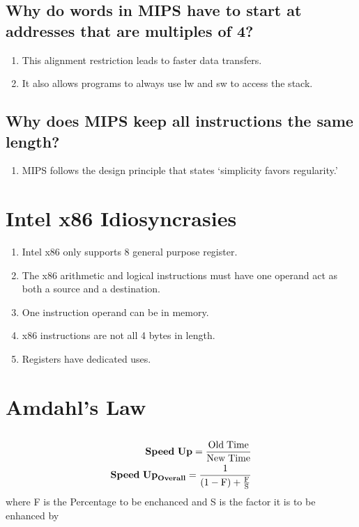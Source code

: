 \documentclass[12pt]{article}
\begin{document}
\subsection*{Why do words in MIPS have to start at addresses that are multiples of 4?}
\begin{enumerate}
	\item{This alignment restriction leads to faster data transfers.}
	\item{It also allows programs to always use lw and sw to access the stack.}
\end{enumerate}

\subsection*{Why does MIPS keep all instructions the same length?}
\begin{enumerate}
	\item{MIPS follows the design principle that states `simplicity favors regularity.'}
\end{enumerate}


\section{Intel x86 Idiosyncrasies}
\begin{enumerate}
	\item{Intel x86 only supports 8 general purpose register.}
	\item{The x86 arithmetic and logical instructions must have one operand act as both a source and a destination.}
	\item{One instruction operand can be in memory.}
	\item{x86 instructions are not all 4 bytes in length.}
	\item{Registers have dedicated uses.}
\end{enumerate}

\section{Amdahl's Law}
\subsection*{}
\begin{align*}
	\mathrm{\textbf{Speed\;Up}} = \frac{\mathrm{Old\;Time}}{\mathrm{New\;Time}}\\
	\mathrm{\textbf{Speed\;Up}}_{\mathrm{\textbf{Overall}}} = \frac{1}{(1-\mathrm{F})+\frac{\mathrm{F}}{\mathrm{S}}}\\
\end{align*}
where F is the Percentage to be enchanced and S is the factor it is to be enhanced by\\
\end{document}
